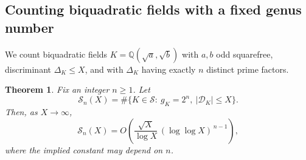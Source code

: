 \documentclass[12 pt]{amsart}
\newcommand{\cS}{\mathcal{S}}
\newcommand\cD{{\mathcal{D}}}
\newtheorem{theorem}[thm]{Theorem}
\theoremstyle{definition}
\theoremstyle{remark}
\begin{document}
\subsection{Counting biquadratic fields with a fixed genus number}
We count biquadratic fields $K=\mathbb{Q}(\sqrt a,\sqrt b)$ with $a,b$ odd squarefree, discriminant $\Delta_K\le X$, and with $\Delta_K$ having exactly $n$ distinct prime factors. 



\begin{theorem}\label{thm:main}
	Fix an integer $n\ge1$. Let
	\[
	\cS_{n}(X)=\#\{K\in\cS:\  g_K=2^{n},\ |\cD_K|\le X\}.
	\]
	Then, as $X\to\infty$,
	\[
	\cS_{n}(X)=O \left(  \frac{\sqrt{X}}{\log X}\,(\log\log X)^{\,n-1} \right),
	\]
	where the implied constant may depend on $n$.
\end{theorem}
\end{document}
